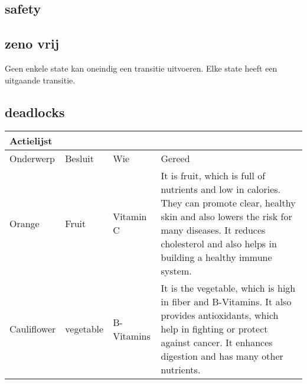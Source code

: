  \subsection{safety}
 
 \subsection{zeno vrij}
 Geen enkele state kan oneindig een transitie uitvoeren. Elke state heeft een uitgaande transitie.
 
 \subsection{deadlocks}
 
 
 
 
 
 
 
 \begin{center}  
 	\begin{tabular}{ | l | l | l | p{5cm} |} %
 		\hline  
 		\multicolumn{4}{|l|}{Actielijst} \\ \hline  
 		Onderwerp & Besluit & Wie &Gereed \\ \hline  
 		Orange & Fruit & Vitamin C & It is fruit, which is full of nutrients and low in calories. They can promote clear, healthy skin and also lowers the risk for many diseases. It reduces cholesterol and also helps in building a healthy immune system.\\ \hline  
 		
 		Cauliflower & vegetable & B-Vitamins & It is the vegetable, which is high in fiber and B-Vitamins. It also provides antioxidants, which help in fighting or protect against cancer. It enhances digestion and has many other nutrients.\\ \hline  
 		
 	\end{tabular}  
 \end{center}  
 
 
 
 
 
 
 
 
 
 
 
